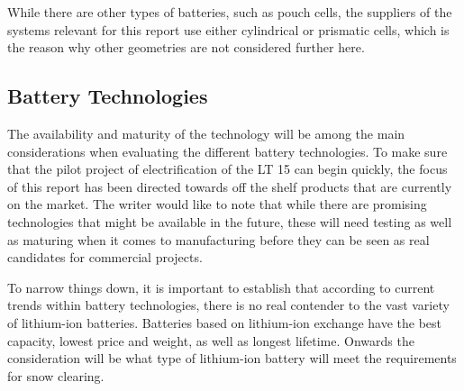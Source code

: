 \documentclass{article}
\begin{document}
While there are other types of batteries, such as pouch cells, the suppliers of the systems relevant for this report use either cylindrical or prismatic cells, which is the reason why other geometries are not considered further here.

\subsection{Battery Technologies}

The availability and maturity of the technology will be among the main considerations when evaluating the different battery technologies. To make sure that the pilot project of electrification of the LT 15 can begin quickly, the focus of this report has been directed towards off the shelf products that are currently on the market. The writer would like to note that while there are promising technologies that might be available in the future, these will need testing as well as maturing when it comes to manufacturing before they can be seen as real candidates for commercial projects.

To narrow things down, it is important to establish that according to current trends within battery technologies, there is no real contender to the vast variety of lithium-ion batteries. Batteries based on lithium-ion exchange have the best capacity, lowest price and weight, as well as longest lifetime. Onwards the consideration will be what type of lithium-ion battery will meet the requirements for snow clearing.
\end{document}
